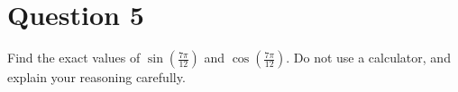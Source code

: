 \chapter{Question 5}
Find the exact values of $\sin(\frac{7\pi}{12})$ and $\cos(\frac{7\pi}{12})$.
Do not use a calculator, and explain your reasoning carefully.
